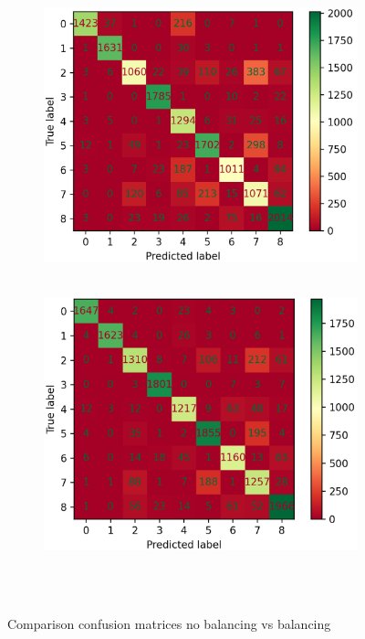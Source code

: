 \begin{figure}[ht]
	\centering
	\begin{subfigure}{0.45\columnwidth}
		\includegraphics[width=\columnwidth]{./figures/Alex_420_no_balancing_conf_matrix_cropped.png}
		~\label{fig:nobalancing}
	\end{subfigure} 
	\begin{subfigure}{0.45\columnwidth}
		\includegraphics[width=\columnwidth]{./figures/Alex_420_with_balancing_conf_matrix_cropped.png}
		~\label{fig:balancing}
	\end{subfigure}
	\caption{Comparison confusion matrices no balancing vs balancing}~\label{fig:balancingcombined}
\end{figure}


